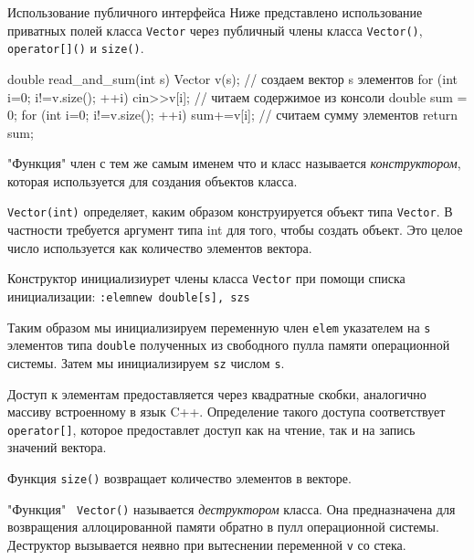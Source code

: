 \documentclass[
    9pt,
    hyperref={pdfencoding=unicode}
    ]{beamer}
\theoremstyle{definition}
\begin{document}
\begin{frame}[fragile]{Использование публичного интерфейса}
    Ниже представлено использование приватных полей класса \texttt{Vector} через публичный члены класса \texttt{Vector()},  \texttt{operator[]()} и 
    \texttt{size()}.
    
    \vfill
    
    \begin{cppcode}
        double read_and_sum(int s)
        {
            Vector v(s); // создаем вектор s элементов
            for (int i=0; i!=v.size(); ++i)
                cin>>v[i]; // читаем содержимое из консоли
            double sum = 0;
            for (int i=0; i!=v.size(); ++i)
                sum+=v[i]; // считаем сумму элементов
            return sum;
        }
    \end{cppcode}

"Функция" член с тем же самым именем что и класс называется \emph{конструктором}, которая используется для создания объектов класса.

\vfill

\texttt{Vector(int)} определяет, каким образом конструируется объект типа \texttt{Vector}. В частности требуется аргумент типа int для того, чтобы создать объект. Это целое число используется как количество элементов вектора.
\end{frame}

\begin{frame}    
    Конструктор инициализиурет члены класса \texttt{Vector} 
    при помощи списка инициализации:
    \texttt{:elem{new double[s]}, sz{s}}
    
    \vfill
    
    Таким образом мы инициализируем переменную член \texttt{elem} указателем на \texttt{s} элементов типа \texttt{double} полученных из свободного пулла памяти операционной системы.
    Затем мы инициализируем \texttt{sz} числом \texttt{s}.
    
    \vfill
    
    Доступ к элементам предоставляется через квадратные скобки, аналогично массиву встроенному в язык C++. Определение такого доступа соответствует \texttt{operator[]}, которое предоставлет доступ как на чтение, так и на запись значений вектора.
    
    \vfill
    
    Функция \texttt{size()} возвращает количество элементов в векторе.
    
    \vfill
    
    "Функция" \texttt{~Vector()} называется \emph{деструктором} класса. 
    Она предназначена для возвращения аллоцированной памяти обратно в пулл операционной системы. Деструктор вызывается неявно при вытеснении переменной \texttt{v} со стека.
    
\end{frame}
\end{document}
